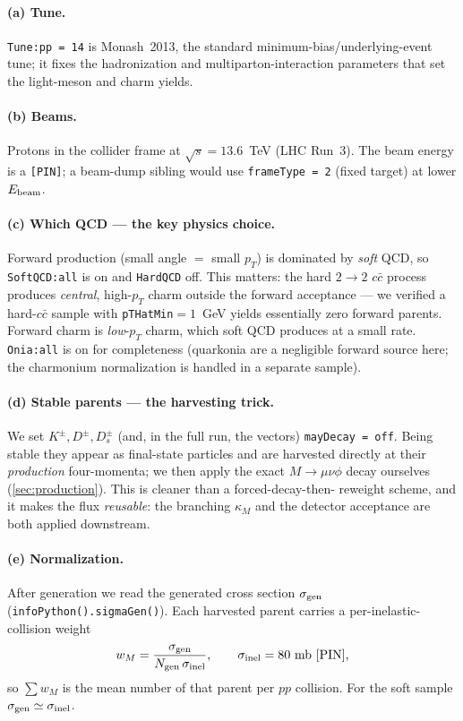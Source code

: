 \documentclass[11pt]{article}
\begin{document}
\paragraph{(a) Tune.} \texttt{Tune:pp = 14} is Monash~2013, the standard
minimum-bias/underlying-event tune; it fixes the hadronization and
multiparton-interaction parameters that set the light-meson and charm yields.

\paragraph{(b) Beams.} Protons in the collider frame at $\sqrt{s}=13.6$~TeV (LHC
Run~3). The beam energy is a \texttt{[PIN]}; a beam-dump sibling would use
\texttt{frameType = 2} (fixed target) at lower $E_{\rm beam}$.

\paragraph{(c) Which QCD --- the key physics choice.} Forward production
(small angle $=$ small $p_T$) is dominated by \emph{soft} QCD, so
\texttt{SoftQCD:all} is on and \texttt{HardQCD} off. This matters: the hard
$2\to2$ $c\bar c$ process produces \emph{central}, high-$p_T$ charm outside the
forward acceptance --- we verified a hard-$c\bar c$ sample with
\texttt{pTHatMin}${=}1$~GeV yields essentially zero forward parents. Forward
charm is \emph{low}-$p_T$ charm, which soft QCD produces at a small rate.
\texttt{Onia:all} is on for completeness (quarkonia are a negligible forward
source here; the charmonium normalization is handled in a separate sample).

\paragraph{(d) Stable parents --- the harvesting trick.} We set $K^\pm,D^\pm,
D_s^\pm$ (and, in the full run, the vectors) \texttt{mayDecay = off}. Being
stable they appear as final-state particles and are harvested directly at their
\emph{production} four-momenta; we then apply the exact $M\to\mu\nu\phi$ decay
ourselves (\cref{sec:production}). This is cleaner than a forced-decay-then-
reweight scheme, and it makes the flux \emph{reusable}: the branching $\kappa_M$
and the detector acceptance are both applied downstream.

\paragraph{(e) Normalization.} After generation we read the generated cross
section $\sigma_{\rm gen}$ (\texttt{infoPython().sigmaGen()}). Each harvested
parent carries a per-inelastic-collision weight
\begin{equation}
w_M = \frac{\sigma_{\rm gen}}{N_{\rm gen}\,\sigma_{\rm inel}},\qquad
\sigma_{\rm inel} = 80~\text{mb}~\text{[PIN]},
\label{eq:wnorm}
\end{equation}
so $\sum w_M$ is the mean number of that parent per $pp$ collision. For the soft
sample $\sigma_{\rm gen}\simeq\sigma_{\rm inel}$.
\end{document}
